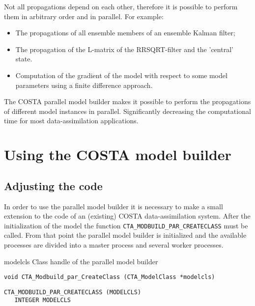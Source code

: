 Not all propagations depend on each other, therefore it is possible to
perform them in arbitrary order and in parallel. For example:
\begin{itemize}
\item The propagations of all ensemble members of an ensemble Kalman filter; 
\item The propagation of the L-matrix of the RRSQRT-filter and the 
      'central' state.
\item Computation of the gradient of the model with respect to some model
      parameters using a finite difference approach.
\end{itemize}

The COSTA parallel model builder makes it possible to perform the
propagations of different model instances in parallel. Significantly decreasing
the computational time for most data-assimilation applications.

\section{Using the COSTA model builder} \label{Sec:Using the COSTA model builder}
\subsection{Adjusting the code}
In order to use the parallel model builder it is necessary to make a small
extension to the code of an (existing) COSTA data-assimilation system.
After the initialization of the model the function 
{\tt CTA\_MODBUILD\_PAR\_CREATECLASS} must be called. From that
point the parallel model builder is initialized and the available processes
are divided into  a master process and several worker processes.

\horzline
\begin{tabbing}
\functab
{}
 {modelcls}  {Class handle of the parallel model builder }\\
\end{tabbing}
\horzline

\begin{verbatim}
void CTA_Modbuild_par_CreateClass (CTA_ModelClass *modelcls)
\end{verbatim}

\begin{verbatim}
CTA_MODBUILD_PAR_CREATECLASS (MODELCLS)
   INTEGER MODELCLS
\end{verbatim}

